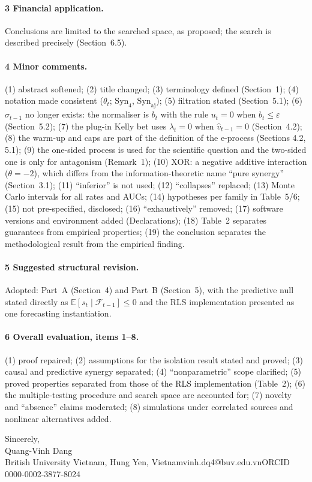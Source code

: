 \documentclass[11pt,a4paper]{article}
\begin{document}
\paragraph{3 Financial application.} Conclusions are limited to the searched space, as proposed; the search is described precisely (Section~6.5).

\paragraph{4 Minor comments.} (1) abstract softened; (2) title changed; (3) terminology defined (Section~1); (4) notation made consistent ($\theta_t$; $\mathrm{Syn}_4$, $\mathrm{Syn}_{\mathrm{aj}}$); (5) filtration stated (Section~5.1); (6) $\hat\sigma_{t-1}$ no longer exists: the normaliser is $b_t$ with the rule $u_t=0$ when $b_t\le\varepsilon$ (Section~5.2); (7) the plug-in Kelly bet uses $\lambda_t=0$ when $\hat v_{t-1}=0$ (Section~4.2); (8) the warm-up and caps are part of the definition of the e-process (Sections 4.2, 5.1); (9) the one-sided process is used for the scientific question and the two-sided one is only for antagonism (Remark~1); (10) XOR: a negative additive interaction ($\theta=-2$), which differs from the information-theoretic name ``pure synergy'' (Section~3.1); (11) ``inferior'' is not used; (12) ``collapses'' replaced; (13) Monte Carlo intervals for all rates and AUCs; (14) hypotheses per family in Table~5/6; (15) not pre-specified, disclosed; (16) ``exhaustively'' removed; (17) software versions and environment added (Declarations); (18) Table~2 separates guarantees from empirical properties; (19) the conclusion separates the methodological result from the empirical finding.

\paragraph{5 Suggested structural revision.} Adopted: Part~A (Section~4) and Part~B (Section~5), with the predictive null stated directly as $\mathbb E[s_t\mid\mathcal F_{t-1}]\le0$ and the RLS implementation presented as one forecasting instantiation.

\paragraph{6 Overall evaluation, items 1--8.} (1) proof repaired; (2) assumptions for the isolation result stated and proved; (3) causal and predictive synergy separated; (4) ``nonparametric'' scope clarified; (5) proved properties separated from those of the RLS implementation (Table~2); (6) the multiple-testing procedure and search space are accounted for; (7) novelty and ``absence'' claims moderated; (8) simulations under correlated sources and nonlinear alternatives added.

\bigskip
Sincerely,\\
Quang-Vinh Dang\\
British University Vietnam, Hung Yen, Vietnam\quad vinh.dq4@buv.edu.vn\quad ORCID 0000-0002-3877-8024
\end{document}
